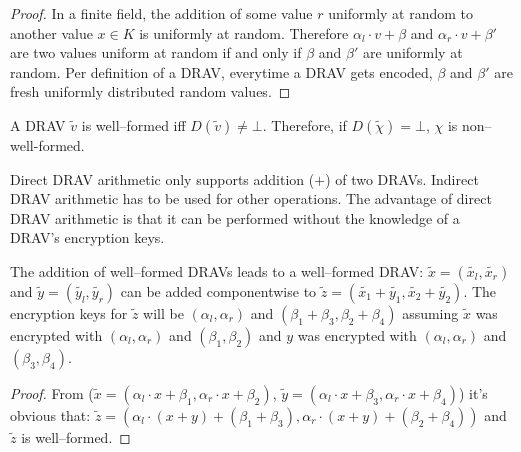 \begin{proof}

  In a finite field, the addition of some value $r$ uniformly at random to
  another value $x \in K$ is uniformly at random. Therefore $\alpha_l \cdot v +
  \beta$ and $\alpha_r \cdot v + \beta'$ are two values uniform at random if and
  only if $\beta$ and $\beta'$ are uniformly at random. Per definition of a
  DRAV, everytime a DRAV gets encoded, $\beta$ and $\beta'$ are fresh uniformly
  distributed random values.

\end{proof}



A DRAV $\widetilde{v}$ is well--formed iff $D(\widetilde{v}) \neq \bot$.
Therefore, if $D(\widetilde{\chi}) = \bot$, $\chi$ is non--well-formed.


\label{sec:direct-DRAV-arithmetic}

Direct DRAV arithmetic only supports addition ($+$) of two DRAVs. Indirect DRAV
arithmetic has to be used for other operations. The advantage of direct DRAV
arithmetic is that it can be performed without the knowledge of a DRAV's
encryption keys.

\begin{lem}
  \label{lem:DRAV-add}

The addition of well--formed DRAVs leads to a well--formed DRAV:
$\widetilde{x} = (\widetilde{x_l}, \widetilde{x_r})$ and $\widetilde{y} =
(\widetilde{y_l}, \widetilde{y_r})$ can be added componentwise to $\widetilde{z}
= \left(\widetilde{x_1} + \widetilde{y_1}, \widetilde{x_2} +
\widetilde{y_2}\right)$. The encryption keys for $\widetilde{z}$ will be
$(\alpha_l, \alpha_r)$ and $(\beta_1 + \beta_3, \beta_2 + \beta_4)$ assuming
$\widetilde{x}$ was encrypted with $(\alpha_l, \alpha_r)$ and $(\beta_1,
\beta_2)$ and $y$ was encrypted with $(\alpha_l, \alpha_r)$ and $(\beta_3,
\beta_4)$.

\end{lem}

\begin{proof}

From ($\widetilde{x} = \left(\alpha_l \cdot x + \beta_1,
\alpha_r \cdot x + \beta_2\right)$, $\widetilde{y} = \left(\alpha_l \cdot x +
\beta_3, \alpha_r \cdot x + \beta_4\right)$) it's obvious that: $\widetilde{z} =
\left(\alpha_l \cdot (x+y) + (\beta_1 + \beta_3), \alpha_r \cdot (x+y) +
(\beta_2 + \beta_4)\right)$ and $\widetilde{z}$ is well--formed.

\end{proof}

